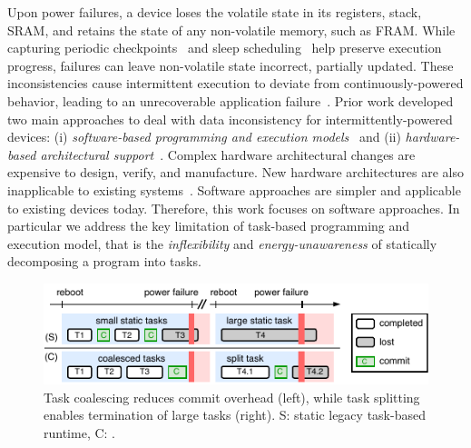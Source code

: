 Upon power failures, a device loses the volatile state in its registers, stack, SRAM, and retains the state of any non-volatile memory, such as FRAM. While capturing periodic checkpoints~\cite{mementos,quickrecall} and sleep scheduling~\cite{dewdrop,hibernus,hibernusplusplus} help preserve execution progress, failures can leave non-volatile state incorrect, partially updated. These inconsistencies cause intermittent execution to deviate from continuously-powered behavior, leading to an unrecoverable application failure~\cite{dino,edb}. Prior work developed two main approaches to deal with data inconsistency for intermittently-powered devices: (i) \emph{software-based programming and execution models}~\cite{dino,ratchet,chain,alpaca} and (ii) \emph{hardware-based architectural support}~\cite{hicks_isca_2017,idetic,nvp}. Complex hardware architectural changes are expensive to design, verify, and manufacture. New hardware architectures are also inapplicable to existing systems~\cite{hicks_isca_2017,nvp}. Software approaches are simpler and applicable to existing devices today. Therefore, this work focuses on software approaches. In particular we address the key limitation of task-based programming and execution model, that is the {\em inflexibility} and \emph{energy-unawareness} of statically decomposing a program into tasks.
%
\begin{figure}
    \centering
    \includegraphics[width=\columnwidth]{figures/intro-figure-v5.pdf}
    \caption{Task coalescing reduces commit overhead (left), while task splitting enables termination of large tasks (right).
    S: static legacy task-based runtime, C: \sys.}
    \label{fig:coalesce}
\end{figure}


